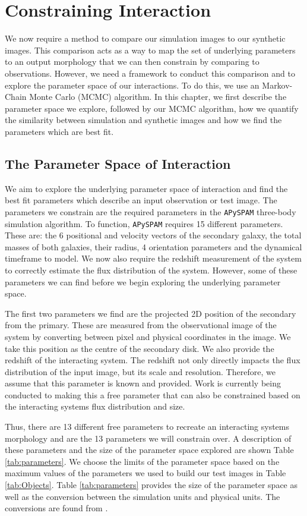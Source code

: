 \section{Constraining Interaction}\label{method:constraint}
We now require a method to compare our simulation images to our synthetic images. This comparison acts as a way to map the set of underlying parameters to an output morphology that we can then constrain by comparing to observations. However, we need a framework to conduct this comparison and to explore the parameter space of our interactions. To do this, we use an Markov-Chain Monte Carlo (MCMC) algorithm. In this chapter, we first describe the parameter space we explore, followed by our MCMC algorithm, how we quantify the similarity between simulation and synthetic images and how we find the parameters which are best fit.

\subsection{The Parameter Space of Interaction}
We aim to explore the underlying parameter space of interaction and find the best fit parameters which describe an input observation or test image. The parameters we constrain are the required parameters in the \texttt{APySPAM} three-body simulation algorithm. To function, \texttt{APySPAM} requires 15 different parameters. These are: the 6 positional and velocity vectors of the secondary galaxy, the total masses of both galaxies, their radius, 4 orientation parameters and the dynamical timeframe to model. We now also require the redshift measurement of the system to correctly estimate the flux distribution of the system. However, some of these parameters we can find before we begin exploring the underlying parameter space.

The first two parameters we find are the projected 2D position of the secondary from the primary. These are measured from the observational image of the system by converting between pixel and physical coordinates in the image. We take this position as the centre of the secondary disk. We also provide the redshift of the interacting system. The redshift not only directly impacts the flux distribution of the input image, but its scale and resolution. Therefore, we assume that this parameter is known and provided. Work is currently being conducted to making this a free parameter that can also be constrained based on the interacting systems flux distribution and size.

Thus, there are 13 different free parameters to recreate an interacting systems morphology and are the 13 parameters we will constrain over. A description of these parameters and the size of the parameter space explored are shown Table \ref{tab:parameters}. We choose the limits of the parameter space based on the maximum values of the parameters we used to build our test images in Table \ref{tab:Objects}. Table \ref{tab:parameters} provides the size of the parameter space as well as the conversion between the simulation units and physical units. \DIFdelbegin {}\DIFdelend The conversions are found from \citet{1990AJ....100.1477W}.

